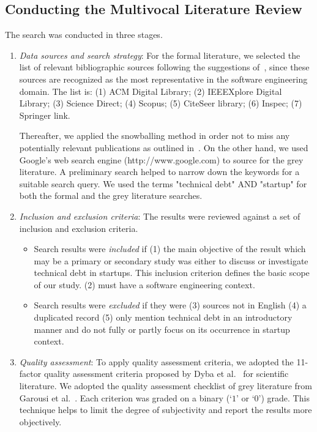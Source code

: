 \subsection{Conducting the Multivocal Literature Review}
The search was conducted in three stages.
\begin{enumerate}
\item \emph{Data sources and search strategy}: For the formal literature, we selected the list of relevant bibliographic sources following the suggestions of~\cite{kitchenham2007guidelines}, since these sources are
recognized as the most representative in the software engineering domain.
The list is: (1) ACM Digital Library;  (2) IEEEXplore Digital Library; (3) Science Direct; (4) Scopus; (5) CiteSeer library; (6) Inspec; (7) Springer link.

Thereafter, we applied the snowballing method in order not to miss any potentially relevant publications as outlined in~\cite{Wohlin2014/2601248.2601268}.
On the other hand, we used Google's web search engine (http://www.google.com) to source for the grey literature.
A preliminary search helped to narrow down the keywords for a suitable search query.
We used the terms "technical debt" AND "startup" for both the formal and the grey literature searches.

\item \emph{Inclusion and exclusion criteria}: The results were reviewed against a set of inclusion and exclusion criteria.

\begin{itemize}
\item Search results were \emph{included} if 
(1) the main objective of the result which may be a primary or secondary  study was either to discuss or investigate technical debt in startups.
This inclusion criterion defines the basic scope of our study.
(2) must have a software engineering context.

\item Search results were \emph{excluded} if they were 
(3) sources not in English
(4) a duplicated record 
(5) only mention technical debt in an introductory manner and do not fully or partly focus on its occurrence in startup context.
\end{itemize}

\item \emph{Quality assessment}: To apply quality assessment criteria, we adopted the 11-factor quality
assessment criteria proposed by Dyba et al.~\cite{DYBA2008833} for scientific literature.
We adopted the quality assessment checklist of grey literature from Garousi et al.~\cite{GAROUSI2019101}.
Each criterion was graded on a binary (`$1$' or `$0$') grade.
This technique helps to limit the degree of subjectivity and report the results more objectively. 
\end{enumerate}


